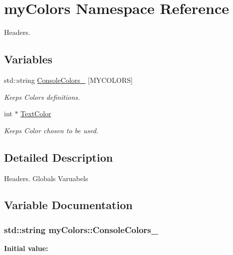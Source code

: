 \hypertarget{namespacemyColors}{
\section{myColors Namespace Reference}
\label{namespacemyColors}
}


Headers.  


\subsection*{Variables}
\begin{DoxyCompactItemize}
\item 
std::string \hyperlink{namespacemyColors_acd2740448dd52d14badb1864e14401ce}{ConsoleColors\_\-} \mbox{[}MYCOLORS\mbox{]}
\begin{DoxyCompactList}\small\item\em Keeps Colors definitions. \item\end{DoxyCompactList}\item 
int $\ast$ \hyperlink{namespacemyColors_a52b646aad549675b463b1b37c6be6145}{TextColor}
\begin{DoxyCompactList}\small\item\em Keeps Color chosen to be used. \item\end{DoxyCompactList}\end{DoxyCompactItemize}


\subsection{Detailed Description}
Headers. Globals Varuabels 

\subsection{Variable Documentation}
\hypertarget{namespacemyColors_acd2740448dd52d14badb1864e14401ce}{
\subsubsection[{ConsoleColors\_\-}]{\setlength{\rightskip}{0pt plus 5cm}std::string {\bf myColors::ConsoleColors\_\-}}}
\label{namespacemyColors_acd2740448dd52d14badb1864e14401ce}
{\bfseries Initial value:}

